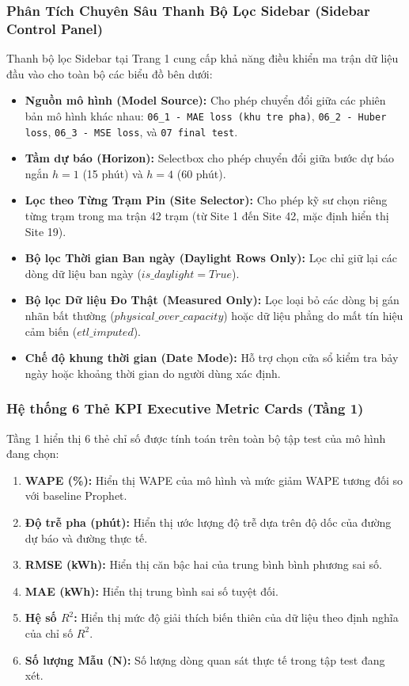 \documentclass[12pt,a4paper]{article}
\begin{document}
\subsubsection{Phân Tích Chuyên Sâu Thanh Bộ Lọc Sidebar (Sidebar Control Panel)}
Thanh bộ lọc Sidebar tại Trang 1 cung cấp khả năng điều khiển ma trận dữ liệu đầu vào cho toàn bộ các biểu đồ bên dưới:
\begin{itemize}
    \item \textbf{Nguồn mô hình (Model Source):} Cho phép chuyển đổi giữa các phiên bản mô hình khác nhau: \texttt{06\_1 - MAE loss (khu tre pha)}, \texttt{06\_2 - Huber loss}, \texttt{06\_3 - MSE loss}, và \texttt{07 final test}.
    \item \textbf{Tầm dự báo (Horizon):} Selectbox cho phép chuyển đổi giữa bước dự báo ngắn $h=1$ (15 phút) và $h=4$ (60 phút).
    \item \textbf{Lọc theo Từng Trạm Pin (Site Selector):} Cho phép kỹ sư chọn riêng từng trạm trong ma trận 42 trạm (từ Site 1 đến Site 42, mặc định hiển thị Site 19).
    \item \textbf{Bộ lọc Thời gian Ban ngày (Daylight Rows Only):} Lọc chỉ giữ lại các dòng dữ liệu ban ngày ($is\_daylight = True$).
    \item \textbf{Bộ lọc Dữ liệu Đo Thật (Measured Only):} Lọc loại bỏ các dòng bị gán nhãn bất thường ($physical\_over\_capacity$) hoặc dữ liệu phẳng do mất tín hiệu cảm biến ($etl\_imputed$).
    \item \textbf{Chế độ khung thời gian (Date Mode):} Hỗ trợ chọn cửa sổ kiểm tra bảy ngày hoặc khoảng thời gian do người dùng xác định.
\end{itemize}

\subsubsection{Hệ thống 6 Thẻ KPI Executive Metric Cards (Tầng 1)}
Tầng 1 hiển thị 6 thẻ chỉ số được tính toán trên toàn bộ tập test của mô hình đang chọn:
\begin{enumerate}
    \item \textbf{WAPE (\%):} Hiển thị WAPE của mô hình và mức giảm WAPE tương đối so với baseline Prophet.
    \item \textbf{Độ trễ pha (phút):} Hiển thị ước lượng độ trễ dựa trên độ dốc của đường dự báo và đường thực tế.
    \item \textbf{RMSE (kWh):} Hiển thị căn bậc hai của trung bình bình phương sai số.
    \item \textbf{MAE (kWh):} Hiển thị trung bình sai số tuyệt đối.
    \item \textbf{Hệ số $R^2$:} Hiển thị mức độ giải thích biến thiên của dữ liệu theo định nghĩa của chỉ số $R^2$.
    \item \textbf{Số lượng Mẫu (N):} Số lượng dòng quan sát thực tế trong tập test đang xét.
\end{enumerate}
\end{document}
